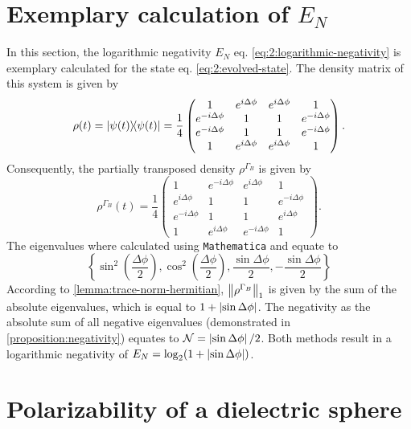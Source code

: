 \section{Exemplary calculation of $E_N$}\label{apx:E_N-exemplary}
In this section, the logarithmic negativity $E_N$ eq. \eqref{eq:2:logarithmic-negativity} is exemplary calculated for the state eq. \eqref{eq:2:evolved-state}.
The density matrix of this system is given by
\begin{equation}
  \rho(t) = \ketbra{\psi(t)} = \frac{1}{4}
  \begin{pmatrix}
    1 & e^{i\Delta\phi}  & e^{i\Delta\phi} & 1 \\
    e^{-i\Delta\phi} & 1 & 1  & e^{-i\Delta\phi} \\
    e^{-i\Delta\phi} & 1  & 1 & e^{-i\Delta\phi} \\
    1 & e^{i\Delta\phi} & e^{i\Delta\phi} & 1
  \end{pmatrix}.
\end{equation}
Consequently, the partially transposed density $\rho^{\Gamma_B}$ is given by
\begin{equation}
  \rho^{\Gamma_B}(t) = \frac{1}{4}
  \begin{pmatrix}
    1 & e^{-i\Delta\phi}  & e^{i\Delta\phi} & 1 \\
    e^{i\Delta\phi} & 1 & 1  & e^{-i\Delta\phi} \\
    e^{-i\Delta\phi} & 1  & 1 & e^{i\Delta\phi} \\
    1 & e^{i\Delta\phi} & e^{-i\Delta\phi} & 1
  \end{pmatrix}.
\end{equation}
The eigenvalues where calculated using \texttt{Mathematica} and equate to
\begin{equation*}
  \left\{ \sin^2\left(\frac{\Delta\phi}{2}\right), \cos^2\left(\frac{\Delta\phi}{2}\right), \frac{\sin\Delta\phi}{2}, -\frac{\sin\Delta\phi}{2} \right\}
\end{equation*}
According to \cref{lemma:trace-norm-hermitian}, $\left\lVert\rho^{\Gamma_B}\right\rVert_1$ is given by the sum of the absolute eigenvalues, which is equal to $1+\left\lvert\sin\Delta\phi\right\rvert$. The negativity as the absolute sum of all negative eigenvalues (demonstrated in \cref{proposition:negativity}) equates to $\mathcal{N} = \left\lvert\sin\Delta\phi\right\rvert/2$. Both methods result in a logarithmic negativity of $E_N = \log_2(1 + \left\lvert\sin\Delta\phi\right\rvert)$.




\section{Polarizability of a dielectric sphere}
\label{apx:polarizability-sphere}

